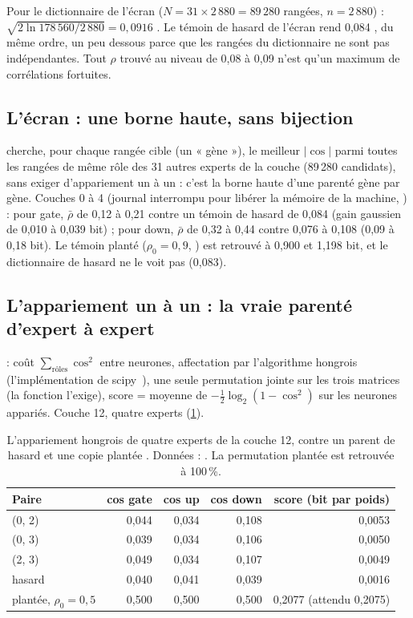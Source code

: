 Pour le dictionnaire de l'écran ($N = 31 \times 2\,880 = 89\,280$ rangées, $n = 2\,880$) : $\sqrt{2\ln 178\,560 / 2\,880} = 0{,}0916$ \calc. Le témoin de hasard de l'écran rend 0,084 \mes, du même ordre, un peu dessous parce que les rangées du dictionnaire ne sont pas indépendantes. Tout $\rho$ trouvé au niveau de 0,08 à 0,09 n'est qu'un maximum de corrélations fortuites.

\subsection{L'écran : une borne haute, sans bijection}

 cherche, pour chaque rangée cible (un « gène »), le meilleur $|\cos|$ parmi toutes les rangées de même rôle des 31 autres experts de la couche (89\,280 candidats), sans exiger d'appariement un à un : c'est la borne haute d'une parenté gène par gène. Couches 0 à 4 (journal interrompu pour libérer la mémoire de la machine, ) \mes : pour gate, $\bar\rho$ de 0,12 à 0,21 contre un témoin de hasard de 0,084 (gain gaussien de 0,010 à 0,039 bit) ; pour down, $\bar\rho$ de 0,32 à 0,44 contre 0,076 à 0,108 (0,09 à 0,18 bit). Le témoin planté ($\rho_0 = 0{,}9$, ) est retrouvé à 0,900 et 1,198 bit, et le dictionnaire de hasard ne le voit pas (0,083).

\subsection{L'appariement un à un : la vraie parenté d'expert à expert}

 : coût $\sum_{\text{rôles}} \cos^2$ entre neurones, affectation par l'algorithme hongrois~\cite{kuhn1955hungarian} (l'implémentation de scipy~\cite{crouse2016assignment}), une seule permutation jointe sur les trois matrices (la fonction l'exige), score = moyenne de $-\frac12\log_2(1 - \cos^2)$ sur les neurones appariés. Couche 12, quatre experts (\cref{t3dup:tab:paires}).

\begin{table}[tbp]
\centering\small
\begin{tabular}{l r r r r}
\toprule
Paire & cos gate & cos up & cos down & score (bit par poids) \\
\midrule
(0, 2) & 0,044 & 0,034 & 0,108 & 0,0053 \\
(0, 3) & 0,039 & 0,034 & 0,106 & 0,0050 \\
(2, 3) & 0,049 & 0,034 & 0,107 & 0,0049 \\
hasard & 0,040 & 0,041 & 0,039 & 0,0016 \\
plantée, $\rho_0 = 0{,}5$ & 0,500 & 0,500 & 0,500 & 0,2077 (attendu 0,2075) \\
\bottomrule
\end{tabular}
\caption[L'appariement hongrois, couche 12]{L'appariement hongrois de quatre experts de la couche 12, contre un parent de hasard et une copie plantée \mes. Données : . La permutation plantée est retrouvée à 100\,\%.}
\label{t3dup:tab:paires}
\end{table}

